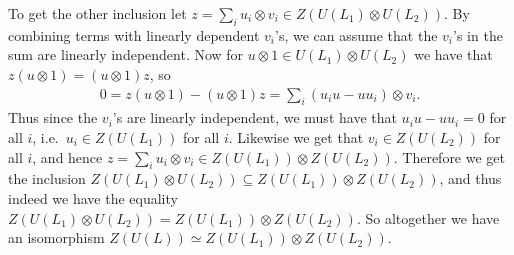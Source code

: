 To get the other inclusion let $z=\sum_i u_i\otimes v_i \in Z(U(L_1)\otimes U(L_2))$. By combining terms with linearly dependent $v_i$'s, we can assume that the $v_i$'s in the sum are linearly independent. Now for $u\otimes 1\in U(L_1)\otimes U(L_2)$ we have that $z(u\otimes 1)=(u\otimes 1)z$, so 
\begin{align*}
  0 = z(u\otimes 1) - (u\otimes 1)z = \sum_i (u_iu - uu_i)\otimes v_i.
\end{align*}
Thus since the $v_i$'s are linearly independent, we must have that $u_iu-uu_i=0$ for all $i$, i.e.\ $u_i\in Z(U(L_1))$ for all $i$. Likewise we get that $v_i\in Z(U(L_2))$ for all $i$, and hence $z=\sum_i u_i\otimes v_i \in Z(U(L_1))\otimes Z(U(L_2))$. Therefore we get the inclusion $Z(U(L_1)\otimes U(L_2))\subseteq Z(U(L_1))\otimes Z(U(L_2))$, and thus indeed we have the equality $Z(U(L_1)\otimes U(L_2))=Z(U(L_1))\otimes Z(U(L_2))$. So altogether we have an isomorphism $Z(U(L))\simeq Z(U(L_1))\otimes Z(U(L_2))$.

